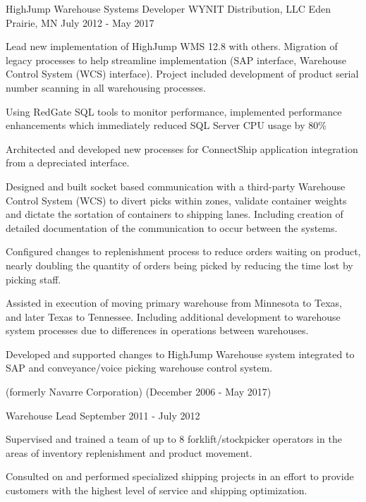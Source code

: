 \begin{cventries}
  \cventry
    {HighJump Warehouse Systems Developer}
    {WYNIT Distribution, LLC}
    {Eden Prairie, MN}
    {July 2012 - May 2017}
    {
      \begin{cvitems}
       \item {Lead new implementation of HighJump WMS 12.8 with others. Migration of legacy processes to help streamline implementation (SAP interface, Warehouse Control System (WCS) interface).  Project included development of product serial number scanning in all warehousing processes.}
       \item {Using RedGate SQL tools to monitor performance, implemented performance enhancements which immediately reduced SQL Server CPU usage by 80\%}
       \item {Architected and developed new processes for ConnectShip application integration from a depreciated interface.}
       \item {Designed and built socket based communication with a third-party Warehouse Control System (WCS) to divert picks within zones, validate container weights and dictate the sortation of containers to shipping lanes. Including creation of detailed documentation of the communication to occur between the systems.}
       \item {Configured changes to replenishment process to reduce orders waiting on product, nearly doubling the quantity of orders being picked by reducing the time lost by picking staff.}
       \item {Assisted in execution of moving primary warehouse from Minnesota to Texas, and later Texas to Tennessee. Including additional development to warehouse system processes due to differences in operations between warehouses.}
       \item {Developed and supported changes to HighJump Warehouse system integrated to SAP and conveyance/voice picking warehouse control system.}
      \end{cvitems}
    }
   {(formerly Navarre Corporation)}
   {(December 2006 - May 2017)}





  \cventry
    {Warehouse Lead}
    {}
    {}
    {September 2011 - July 2012}
    {
      \begin{cvitems}
       \item {Supervised and trained a team of up to 8 forklift/stockpicker operators in the areas of inventory replenishment and product movement.}
       \item {Consulted on and performed specialized shipping projects in an effort to provide customers with the highest level of service and shipping optimization.}
      \end{cvitems}
    }{}{}





\end{cventries}
